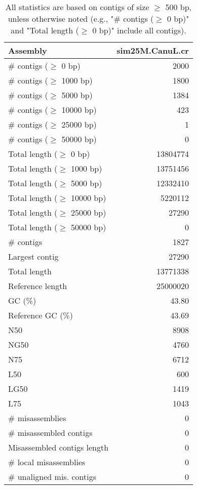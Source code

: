 \documentclass[12pt,a4paper]{article}
\begin{document}
\begin{table}[ht]
\begin{center}
\caption{All statistics are based on contigs of size $\geq$ 500 bp, unless otherwise noted (e.g., "\# contigs ($\geq$ 0 bp)" and "Total length ($\geq$ 0 bp)" include all contigs).}
\begin{tabular}{|l*{1}{|r}|}
\hline
Assembly & sim25M.CanuL.cr \\ \hline
\# contigs ($\geq$ 0 bp) & 2000 \\ \hline
\# contigs ($\geq$ 1000 bp) & 1800 \\ \hline
\# contigs ($\geq$ 5000 bp) & 1384 \\ \hline
\# contigs ($\geq$ 10000 bp) & 423 \\ \hline
\# contigs ($\geq$ 25000 bp) & 1 \\ \hline
\# contigs ($\geq$ 50000 bp) & 0 \\ \hline
Total length ($\geq$ 0 bp) & 13804774 \\ \hline
Total length ($\geq$ 1000 bp) & 13751456 \\ \hline
Total length ($\geq$ 5000 bp) & 12332410 \\ \hline
Total length ($\geq$ 10000 bp) & 5220112 \\ \hline
Total length ($\geq$ 25000 bp) & 27290 \\ \hline
Total length ($\geq$ 50000 bp) & 0 \\ \hline
\# contigs & 1827 \\ \hline
Largest contig & 27290 \\ \hline
Total length & 13771338 \\ \hline
Reference length & 25000020 \\ \hline
GC (\%) & 43.80 \\ \hline
Reference GC (\%) & 43.69 \\ \hline
N50 & 8908 \\ \hline
NG50 & 4760 \\ \hline
N75 & 6712 \\ \hline
L50 & 600 \\ \hline
LG50 & 1419 \\ \hline
L75 & 1043 \\ \hline
\# misassemblies & 0 \\ \hline
\# misassembled contigs & 0 \\ \hline
Misassembled contigs length & 0 \\ \hline
\# local misassemblies & 0 \\ \hline
\# unaligned mis. contigs & 0 \\ \hline

\end{tabular}
\end{center}
\end{table}
\end{document}
